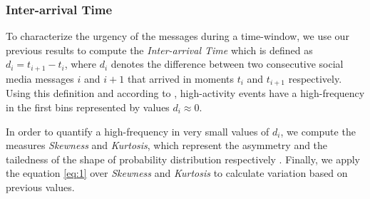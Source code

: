 \documentclass[sigconf]{acmart}
\begin{document}
\subsubsection{Inter-arrival Time}

To characterize the urgency of the messages during a time-window, we use our previous results \cite{DBLP:conf/fdia/Sarmiento17} to compute the \textit{Inter-arrival Time} which is defined as $d_{i} = t_{i+1} - t_{i}$, where $d_{i}$ denotes the difference between two consecutive social media messages $i$ and $i+1$ that arrived in moments $t_{i}$ and $t_{i+1}$ respectively. Using this definition and according to \cite{kalyanam2016prediction}, high-activity events have a high-frequency in the first bins represented by values $d_{i} \approx 0$. 

In order to quantify a high-frequency in very small values of $d_{i}$, we compute the measures \textit{Skewness} and \textit{Kurtosis}, which represent the asymmetry and the tailedness of the shape of probability distribution respectively \cite{mardia1970measures}. Finally, we apply the equation \ref{eq:1} over \textit{Skewness} and \textit{Kurtosis} to calculate variation based on previous values.

\end{document}
